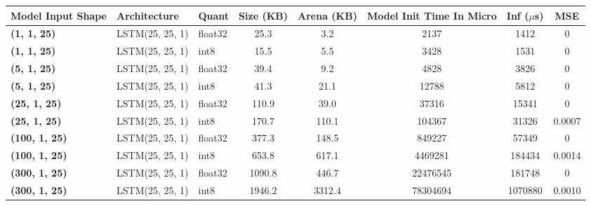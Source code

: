 \begin{tabular}{lllccccc}
\toprule
\textbf{Model Input Shape} & Architecture & Quant & Size (KB) & Arena (KB) & Model Init Time In Micro & Inf ($\mu$s) & MSE \\
\midrule
\textbf{(1, 1, 25)} & LSTM(25, 25, 1) & float32 & 25.3 & 3.2 & 2137 & 1412 & 0 \\
\textbf{(1, 1, 25)} & LSTM(25, 25, 1) & int8 & 15.5 & 5.5 & 3428 & 1531 & 0 \\
\textbf{(5, 1, 25)} & LSTM(25, 25, 1) & float32 & 39.4 & 9.2 & 4828 & 3826 & 0 \\
\textbf{(5, 1, 25)} & LSTM(25, 25, 1) & int8 & 41.3 & 21.1 & 12788 & 5812 & 0 \\
\textbf{(25, 1, 25)} & LSTM(25, 25, 1) & float32 & 110.9 & 39.0 & 37316 & 15341 & 0 \\
\textbf{(25, 1, 25)} & LSTM(25, 25, 1) & int8 & 170.7 & 110.1 & 104367 & 31326 & 0.0007 \\
\textbf{(100, 1, 25)} & LSTM(25, 25, 1) & float32 & 377.3 & 148.5 & 849227 & 57349 & 0 \\
\textbf{(100, 1, 25)} & LSTM(25, 25, 1) & int8 & 653.8 & 617.1 & 4469281 & 184434 & 0.0014 \\
\textbf{(300, 1, 25)} & LSTM(25, 25, 1) & float32 & 1090.8 & 446.7 & 22476545 & 181748 & 0 \\
\textbf{(300, 1, 25)} & LSTM(25, 25, 1) & int8 & 1946.2 & 3312.4 & 78304694 & 1070880 & 0.0010 \\
\bottomrule
\end{tabular}
